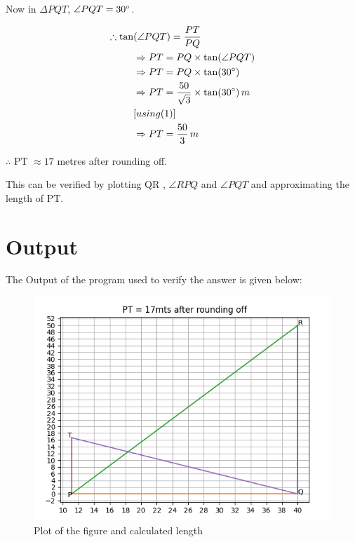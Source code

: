 \documentclass[twocoloumn]{article}
\begin{document}
\begin{multicols}{2}
Now in $\Delta PQT$, $\angle PQT = 30\degree$.

\begin{align*}
\therefore \tan&(\angle PQT) = \frac{PT}{PQ} \\
&\Rightarrow PT = PQ \times \tan(\angle PQT)\\
&\Rightarrow PT = PQ \times \tan(30 \degree)\\
&\Rightarrow PT = \frac{50}{\sqrt{3}} \times \tan(30 \degree) \, m \\
&[using (1)]\\
&\Rightarrow PT = \frac{50}{3}\, m
\end{align*}

\noindent $\therefore$ PT  $ \approx 17 $ metres after rounding off.

\vspace{2pt}
\noindent This can be verified by plotting QR , $\angle RPQ$ and $\angle PQT$ and approximating 
\noindent the length of PT.
\end{multicols}

\pagebreak

\section*{Output}
\noindent The Output of the program used to verify the answer is given below:

\begin{figure}[h]
\includegraphics[width=\textwidth]{output.png}
\caption{Plot of the figure and calculated length}

\end{figure}
\end{document}
